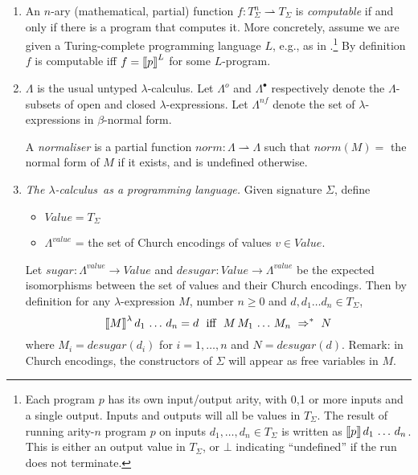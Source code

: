 \documentclass{llncs}
\newcommand{\lsem}{\mbox{$\lbrack\hspace{-0.3ex}\lbrack$}}
\newcommand{\rsem}{\mbox{$\rbrack\hspace{-0.3ex}\rbrack$}}
\newcommand{\vair}{\vspace{3mm}}
\newcommand{\lexp}{$\lambda$-expression}
\newcommand{\lc}{$\lambda$-calculus}
\newcommand{\lopen}{\Lambda^o}
\newcommand{\lclosed}{\Lambda^\bullet}
\newcommand{\lnf}{\Lambda^{nf}}
\begin{document}
\begin{enumerate}

\item An $n$-ary (mathematical, partial) function  $f : T_\Sigma^n \rightharpoonup T_\Sigma$ is {\em computable} if and only if there is a program that computes 
it.
More concretely, assume we are given  a Turing-complete programming language $L$, e.g., as in 
\cite{JGS93}.\footnote
{Each program $p$ has its own input/output arity, with 0,1 or more inputs and a single output. 
Inputs and outputs will all be  values in $T_\Sigma$. The result of running arity-$n$ program $p$ 
on inputs $d_1,\ldots,d_n\in T_\Sigma$ is written as $\lsem p\rsem\, d_1\,\ldots\,d_n$. This is either an output value  in $T_\Sigma$, or $\bot$ indicating ``undefined'' if the run does not terminate.
}
By definition $f$ is computable iff $f = \lsem p\rsem^L$ for some $L$-program. 
\vair 



\item $\Lambda$	   is the usual untyped \lc. Let $\lopen$ and $\lclosed$ respectively denote the $\Lambda$-subsets of open and closed {\lexp}s. Let $\lnf$ denote the set of {\lexp}s in $\beta$-normal form.

A {\em normaliser} is a partial function $\mathit{norm} : \Lambda \rightharpoonup \Lambda$ such that 
$\mathit{norm} (M) =$ the normal form of $M$ if it exists, and is undefined otherwise. 
\vair

\item {\em The \lc\  as a programming language.} Given signature $\Sigma$, define
\vair


\begin{itemize}
\item $\mathit{Value} = T_\Sigma$
\vair

\item $\Lambda^{value}$ = the set of Church encodings of values  $v \in \mathit{Value}$.
\end{itemize}
\vair

Let $\mathit{sugar} : \Lambda^{value} \to \mathit{Value}$ and $\mathit{desugar} : \mathit{Value} \to \Lambda^{value}$ be the  expected isomorphisms between the set of values and their Church encodings.
Then by definition for any {\lexp} $M$, number $n \geq 0$ and $d, d_1\ldots d_n \in T_\Sigma$, 
$$
\lsem M\rsem^\lambda \, d_1\,\ldots\,d_n = d \mbox{\ \  iff\ } \ M\, M_1\,\ldots \,M_n \ \Rightarrow^*\  N
$$
where $M_i = \mathit{desugar} (d_i)$ for $i=1,\ldots,n$ and $N = \mathit{desugar}(d)$.
Remark:  in Church encodings, the constructors of $\Sigma$ will appear as free variables in $M$.
\vair 


\end{enumerate}
\end{document}
